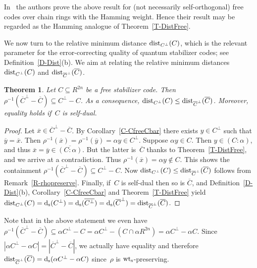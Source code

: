 \documentclass[11pt]{article}
\newtheorem{theo}{Theorem}[section]
\theoremstyle{definition}
\numberwithin{equation}{section}
\newcommand{\wts}{\mbox{${\rm wt}_{\rm s}$}}
\newcommand{\ds}{\mbox{${\rm d}_{\rm s}$}}
\newcommand{\ov}[1]{\mbox{$\overline{#1}$}}
\newcommand{\dist}{\textup{dist}}
\newcounter{alp}
\newcounter{ara}
\newcounter{rom}
\begin{document}
In~\cite{NoSa00} the authors prove the above result for (not necessarily self-orthogonal) free codes over chain rings with the Hamming weight.
Hence their result may be regarded as the Hamming analogue of Theorem~\ref{T-DistFree}.

We now turn to the relative minimum distance $\dist_{C^\perp}(C)$, which is the relevant parameter for the error-correcting quality of quantum stabilizer codes; see Definition~\ref{D-Dist}(b).
We aim at relating the relative minimum distances $\dist_{C^\perp}(C)$ and $\dist_{\overline{C}^\perp}(\ov{C})$.

\begin{theo}\label{T-DistC}
Let $C\subseteq R^{2n}$ be a free stabilizer code.
Then $\rho^{-1}( \ov{C}^{\perp} - \ov{C})\subseteq C^{\perp} - C$.
As a consequence, $\dist_{C^\perp}(C)\leq\dist_{\overline{C}^\perp}(\ov{C})$.
Moreover,  equality holds if~$C$ is self-dual.
\end{theo}

\begin{proof}
Let $\ov{x}\in\ov{C}^\perp - \ov{C}$.
By Corollary~\ref{C-CfreeCbar} there exists $y \in C^{\perp}$ such that $\ov{y} =\ov{x}$.
Then $\rho^{-1}(\ov{x})=\rho^{-1}(\ov{y})=\alpha y\in C^\perp$.
Suppose $\alpha y\in C$. Then $y\in (C:\alpha)$, and thus $\ov{x}=\ov{y}\in\ov{(C:\alpha)}$.
But the latter is~$\ov{C}$ thanks to Theorem~\ref{T-DistFree}, and we arrive at a contradiction.
Thus $\rho^{-1}(\ov{x})=\alpha y\not\in C$.
This shows the containment $\rho^{-1}( \ov{C}^{\perp} - \ov{C})\subseteq C^{\perp} - C$.
Now  $\dist_{C^\perp}(C)\leq\dist_{\small{\overline{C}^\perp}}(\ov{C})$ follows from Remark~\ref{R-rhopreserve}.
Finally, if~$C$ is self-dual then so is $\ov{C}$, and Definition~\ref{D-Dist}(b), Corollary~\ref{C-CfreeCbar}
and Theorem~\ref{T-DistFree} yield  $\dist_{C^\perp}(C)=\ds(C^\perp)=\ds(\ov{C^\perp})=\ds(\ov{C}^\perp)=\dist_{\overline{C}^\perp}(\ov{C})$.
\end{proof}

Note that in the above statement we even have
$\rho^{-1}( \ov{C}^{\perp} - \ov{C})\subseteq \alpha C^{\perp} - C=\alpha C^{\perp}-(C\cap \alpha R^{2n})=\alpha C^{\perp}-\alpha C$.
Since $|\alpha C^{\perp}-\alpha C|=|\ov{C}^{\perp} - \ov{C}|$, we actually have equality and therefore
$\dist_{\small{\overline{C}^\perp}}(\ov{C})=\ds(\alpha C^{\perp}-\alpha C)$ since~$\rho$ is $\wts$-preserving.
\end{document}
